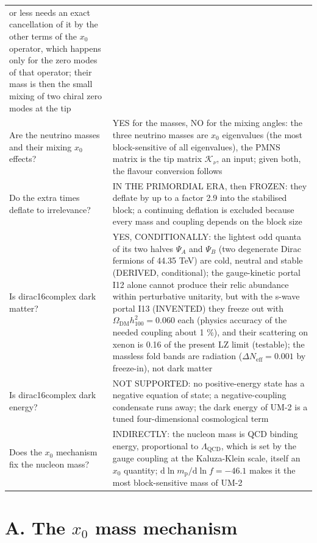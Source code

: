 \documentclass[
  10pt,
]{article}
\begin{document}
\begin{longtable}[]{@{}
  >{\raggedright\arraybackslash}p{}
  >{\raggedright\arraybackslash}p{}@{}}
or less needs an exact cancellation of it by the other terms of the
\(x_0\) operator, which happens only for the zero modes of that
operator; their mass is then the small mixing of two chiral zero modes
at the tip \\
Are the neutrino masses and their mixing \(x_0\) effects? & YES for the
masses, NO for the mixing angles: the three neutrino masses are \(x_0\)
eigenvalues (the most block-sensitive of all eigenvalues), the PMNS
matrix is the tip matrix \(\mathcal{K}_\nu\), an input; given both, the
flavour conversion follows \\
Do the extra times deflate to irrelevance? & IN THE PRIMORDIAL ERA, then
FROZEN: they deflate by up to a factor 2.9 into the stabilised block; a
continuing deflation is excluded because every mass and coupling depends
on the block size \\
Is dirac16complex dark matter? & YES, CONDITIONALLY: the lightest odd
quanta of its two halves \(\Psi_A\) and \(\Psi_B\) (two degenerate Dirac
fermions of 44.35 TeV) are cold, neutral and stable (DERIVED,
conditional); the gauge-kinetic portal I12 alone cannot produce their
relic abundance within perturbative unitarity, but with the s-wave
portal I13 (INVENTED) they freeze out with
\(\Omega_{\mathrm{DM}}h_{100}^2 = 0.060\) each (physics accuracy of the
needed coupling about 1 \%), and their scattering on xenon is 0.16 of
the present LZ limit (testable); the massless fold bands are radiation
(\(\Delta N_{\mathrm{eff}} = 0.001\) by freeze-in), not dark matter \\
Is dirac16complex dark energy? & NOT SUPPORTED: no positive-energy state
has a negative equation of state; a negative-coupling condensate runs
away; the dark energy of UM-2 is a tuned four-dimensional cosmological
term \\
Does the \(x_0\) mechanism fix the nucleon mass? & INDIRECTLY: the
nucleon mass is QCD binding energy, proportional to
\(\Lambda_{\mathrm{QCD}}\), which is set by the gauge coupling at the
Kaluza-Klein scale, itself an \(x_0\) quantity;
\(\mathrm{d}\ln m_{\mathrm{p}}/\mathrm{d}\ln f = -46.1\) makes it the
most block-sensitive mass of UM-2 \\
\end{longtable}

\hypertarget{a.-the-x_0-mass-mechanism}{%
\section*{\texorpdfstring{A. The \(x_0\) mass
mechanism}{A. The x\_0 mass mechanism}}\label{a.-the-x_0-mass-mechanism}}
\end{document}
